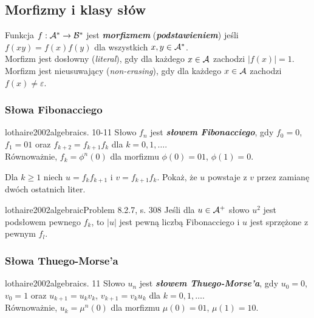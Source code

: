 \subsection{Morfizmy i klasy słów}

\begin{definition}{}{}
  Funkcja $f: \mathcal{A}^* \to \mathcal{B}^*$ jest {\bf\textit{morfizmem}} ({\bf\textit{podstawieniem}}) jeśli $f(xy) = f(x)f(y)$ dla wszystkich $x, y \in \mathcal{A}^*$.
  \\
  Morfizm jest dosłowny (\emph{literal}), gdy dla każdego $x \in \mathcal{A}$ zachodzi $|f(x)| = 1$.
  \\
  Morfizm jest nieusuwający (\emph{non-erasing}), gdy dla każdego $x \in \mathcal{A}$ zachodzi $f(x) \neq \varepsilon$.
\end{definition}

\subsubsection{Słowa Fibonacciego}

\begin{definition}{lothaire2002algebraic}{s. 10-11}
  Słowo $f_n$ jest {\bf\textit{słowem Fibonacciego}}, gdy $f_0 = 0$, $f_1 = 01$ oraz $f_{k + 2} = f_{k + 1} f_k$ dla $k = 0, 1, \ldots$.
  \\
  Równoważnie, $f_k = \phi^n(0)$ dla morfizmu $\phi(0) = 01$, $\phi(1) = 0$.
\end{definition}

\begin{problem}{}{}
  Dla $k \ge 1$ niech $u = f_k f_{k + 1}$ i $v = f_{k + 1} f_k$. Pokaż, że $u$ powstaje z $v$ przez zamianę dwóch ostatnich liter.
\end{problem}

\begin{problem}{lothaire2002algebraic}{Problem 8.2.7, s. 308}
  Jeśli dla $u \in \mathcal{A}^+$ słowo $u^2$ jest podsłowem pewnego $f_k$, to $|u|$ jest pewną liczbą Fibonacciego i $u$ jest sprzężone z pewnym $f_l$.
\end{problem}

\subsubsection{Słowa Thuego-Morse'a}

\begin{definition}{lothaire2002algebraic}{s. 11}
  Słowo $u_n$ jest {\bf\textit{słowem Thuego-Morse'a}}, gdy $u_0 = 0$, $v_0 = 1$ oraz $u_{k + 1} = u_k v_k$, $v_{k + 1} = v_k u_k$ dla $k = 0, 1, \ldots$.
  \\
  Równoważnie, $u_k = \mu^n(0)$ dla morfizmu $\mu(0) = 01$, $\mu(1) = 10$.
\end{definition}


